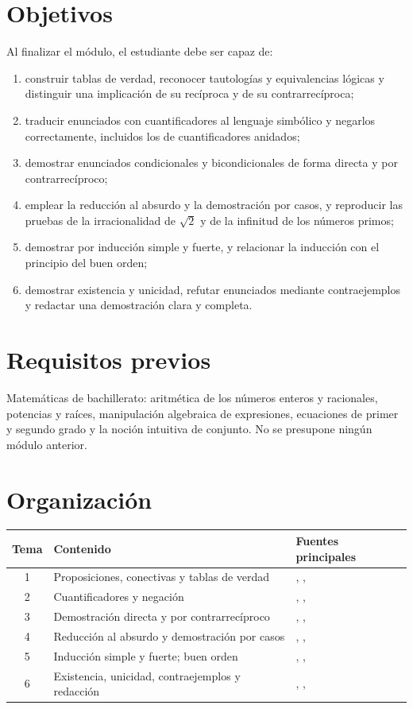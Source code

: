 \documentclass[11pt,a4paper,twoside,openany]{book}
\begin{document}
\section*{Objetivos}
Al finalizar el módulo, el estudiante debe ser capaz de:
\begin{enumerate}[label=\arabic*.]
  \item construir tablas de verdad, reconocer tautologías y equivalencias lógicas y distinguir una implicación de su recíproca y de su contrarrecíproca;
  \item traducir enunciados con cuantificadores al lenguaje simbólico y negarlos correctamente, incluidos los de cuantificadores anidados;
  \item demostrar enunciados condicionales y bicondicionales de forma directa y por contrarrecíproco;
  \item emplear la reducción al absurdo y la demostración por casos, y reproducir las pruebas de la irracionalidad de $\sqrt2$ y de la infinitud de los números primos;
  \item demostrar por inducción simple y fuerte, y relacionar la inducción con el principio del buen orden;
  \item demostrar existencia y unicidad, refutar enunciados mediante contraejemplos y redactar una demostración clara y completa.
\end{enumerate}

\section*{Requisitos previos}
Matemáticas de bachillerato: aritmética de los números enteros y racionales, potencias y raíces, manipulación algebraica de expresiones, ecuaciones de primer y segundo grado y la noción intuitiva de conjunto. No se presupone ningún módulo anterior.

\section*{Organización}
\begin{center}
\begin{tabular}{@{}cll@{}}
\toprule
Tema & Contenido & Fuentes principales \\
\midrule
1 & Proposiciones, conectivas y tablas de verdad & \cite{hammack}, \cite{velleman}, \cite{mcs} \\
2 & Cuantificadores y negación & \cite{hammack}, \cite{velleman}, \cite{cs103} \\
3 & Demostración directa y por contrarrecíproco & \cite{hammack}, \cite{velleman}, \cite{cs103} \\
4 & Reducción al absurdo y demostración por casos & \cite{hammack}, \cite{mcs}, \cite{cs103} \\
5 & Inducción simple y fuerte; buen orden & \cite{hammack}, \cite{mcs}, \cite{velleman} \\
6 & Existencia, unicidad, contraejemplos y redacción & \cite{hammack}, \cite{cs103}, \cite{polya} \\
\bottomrule
\end{tabular}
\end{center}
\end{document}
